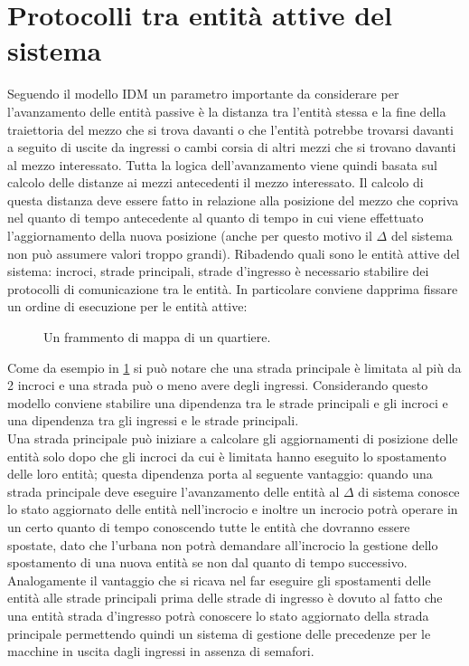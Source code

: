 \newpage
\section{Protocolli tra entità attive del sistema}
Seguendo il modello IDM un parametro importante da considerare per l'avanzamento delle entità passive è la distanza tra l'entità stessa e la fine della traiettoria del mezzo che si trova davanti o che l'entità potrebbe trovarsi davanti a seguito di uscite da ingressi o cambi corsia di altri mezzi che si trovano davanti al mezzo interessato. Tutta la logica dell'avanzamento viene quindi basata sul calcolo delle distanze ai mezzi antecedenti il mezzo interessato. Il calcolo di questa distanza deve essere fatto in relazione alla posizione del mezzo che copriva nel quanto di tempo antecedente al quanto di tempo in cui viene effettuato l'aggiornamento della nuova posizione (anche per questo motivo il $\Delta$ del sistema non può assumere valori troppo grandi). Ribadendo quali sono le entità attive del sistema: incroci, strade principali, strade d'ingresso è necessario stabilire dei protocolli di comunicazione tra le entità. In particolare conviene dapprima fissare un ordine di esecuzione per le entità attive:

\begin{figure}[H] %
\caption{Un frammento di mappa di un quartiere.}
\label{fig:Un frammento di mappa di un quartiere}
\end{figure}

Come da esempio in \ref{fig:Un frammento di mappa di un quartiere} si può notare che una strada principale è limitata al più da 2 incroci e una strada può o meno avere degli ingressi. Considerando questo modello conviene stabilire una dipendenza tra le strade principali e gli incroci e una dipendenza tra gli ingressi e le strade principali. \\
Una strada principale può iniziare a calcolare gli aggiornamenti di posizione delle entità solo dopo che gli incroci da cui è limitata hanno eseguito lo spostamento delle loro entità; questa dipendenza porta al seguente vantaggio: quando una strada principale deve eseguire l'avanzamento delle entità al $\Delta$ di sistema conosce lo stato aggiornato delle entità nell'incrocio e inoltre un incrocio potrà operare in un certo quanto di tempo conoscendo tutte le entità che dovranno essere spostate, dato che l'urbana non potrà demandare all'incrocio la gestione dello spostamento di una nuova entità se non dal quanto di tempo successivo. Analogamente il vantaggio che si ricava nel far eseguire gli spostamenti delle entità alle strade principali prima delle strade di ingresso è dovuto al fatto che una entità strada d'ingresso potrà conoscere lo stato aggiornato della strada principale permettendo quindi un sistema di gestione delle precedenze per le macchine in uscita dagli ingressi in assenza di semafori.

